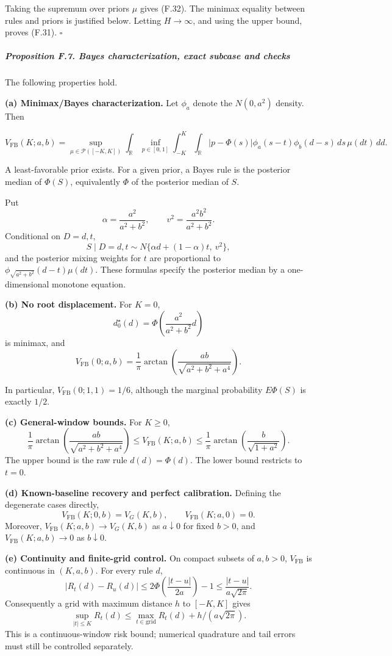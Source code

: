 Taking the supremum over priors \(\mu\) gives (F.32). The minimax
equality between rules and priors is justified below. Letting
\(H\to\infty\), and using the upper bound, proves (F.31). \(\square\)

\subparagraph{Proposition F.7. Bayes characterization, exact subcase and
checks}\label{proposition-f.7.-bayes-characterization-exact-subcase-and-checks}

The following properties hold.

\textbf{(a) Minimax/Bayes characterization.} Let \(\phi_a\) denote the
\(N(0,a^2)\) density. Then

\[
V_{\mathrm{FB}}(K;a,b)
=\sup_{\mu\in\mathcal P([-K,K])}
\int_{\mathbb R}\inf_{p\in[0,1]}
\int_{-K}^{K}\int_{\mathbb R}
|p-\Phi(s)|\phi_a(s-t)\phi_b(d-s)\,ds\,\mu(dt)\,dd.
\tag{F.33}
\]

A least-favorable prior exists. For a given prior, a Bayes rule is the
posterior median of \(\Phi(S)\), equivalently \(\Phi\) of the posterior
median of \(S\).

Put \[
\alpha=\frac{a^2}{a^2+b^2},\qquad
v^2=\frac{a^2b^2}{a^2+b^2}.
\] Conditional on \(D=d,t\), \[
S\mid D=d,t\sim
N\{\alpha d+(1-\alpha)t,\ v^2\},
\] and the posterior mixing weights for \(t\) are proportional to
\(\phi_{\sqrt{a^2+b^2}}(d-t)\mu(dt)\). These formulas specify the
posterior median by a one-dimensional monotone equation.

\textbf{(b) No root displacement.} For \(K=0\), \[
d_0^\star(d)=\Phi\!\left(\frac{a^2}{a^2+b^2}d\right)
\tag{F.34}
\] is minimax, and \[
V_{\mathrm{FB}}(0;a,b)
=\frac1\pi\arctan
\left(\frac{ab}{\sqrt{a^2+b^2+a^4}}\right).
\tag{F.35}
\]

In particular, \(V_{\mathrm{FB}}(0;1,1)=1/6\), although the marginal
probability \(E\Phi(S)\) is exactly \(1/2\).

\textbf{(c) General-window bounds.} For \(K\ge0\), \[
\frac1\pi\arctan
\left(\frac{ab}{\sqrt{a^2+b^2+a^4}}\right)
\le V_{\mathrm{FB}}(K;a,b)
\le \frac1\pi\arctan\left(\frac{b}{\sqrt{1+a^2}}\right).
\tag{F.36}
\] The upper bound is the raw rule \(d(d)=\Phi(d)\). The lower bound
restricts to \(t=0\).

\textbf{(d) Known-baseline recovery and perfect calibration.} Defining
the degenerate cases directly, \[
V_{\mathrm{FB}}(K;0,b)=V_G(K,b),\qquad
V_{\mathrm{FB}}(K;a,0)=0.
\tag{F.37}
\] Moreover, \(V_{\mathrm{FB}}(K;a,b)\to V_G(K,b)\) as \(a\downarrow0\)
for fixed \(b>0\), and \(V_{\mathrm{FB}}(K;a,b)\to0\) as
\(b\downarrow0\).

\textbf{(e) Continuity and finite-grid control.} On compact subsets of
\(a,b>0\), \(V_{\mathrm{FB}}\) is continuous in \((K,a,b)\). For every
rule \(d\), \[
|R_t(d)-R_u(d)|
\le 2\Phi\!\left(\frac{|t-u|}{2a}\right)-1
\le \frac{|t-u|}{a\sqrt{2\pi}}.
\tag{F.38}
\] Consequently a grid with maximum distance \(h\) to \([-K,K]\) gives
\[
\sup_{|t|\le K}R_t(d)
\le\max_{t\in\mathrm{grid}}R_t(d)
     +h/(a\sqrt{2\pi}).
\tag{F.39}
\] This is a continuous-window risk bound; numerical quadrature and tail
errors must still be controlled separately.

